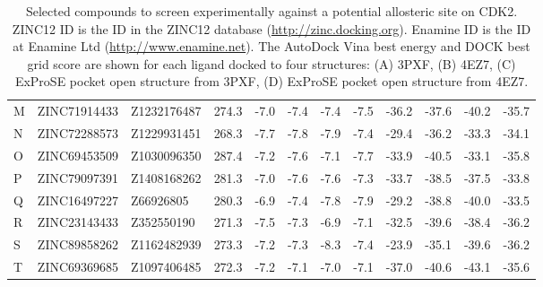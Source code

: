 \begin{table}
\begin{footnotesize}
\begin{tabular}{ p{2cm} l l p{3cm} l l l l l l l l }
M     & ZINC71914433 & Z1232176487 & 274.3 & -7.0  & -7.4  & -7.4  & -7.5  & -36.2 & -37.6 & -40.2 & -35.7 \\
N     & ZINC72288573 & Z1229931451 & 268.3 & -7.7  & -7.8  & -7.9  & -7.4  & -29.4 & -36.2 & -33.3 & -34.1 \\
O     & ZINC69453509 & Z1030096350 & 287.4 & -7.2  & -7.6  & -7.1  & -7.7  & -33.9 & -40.5 & -33.1 & -35.8 \\
P     & ZINC79097391 & Z1408168262 & 281.3 & -7.0  & -7.6  & -7.6  & -7.3  & -33.7 & -38.5 & -37.5 & -33.8 \\
Q     & ZINC16497227 & Z66926805   & 280.3 & -6.9  & -7.4  & -7.8  & -7.9  & -29.2 & -38.8 & -40.0 & -33.5 \\
R     & ZINC23143433 & Z352550190  & 271.3 & -7.5  & -7.3  & -6.9  & -7.1  & -32.5 & -39.6 & -38.4 & -36.2 \\
S     & ZINC89858262 & Z1162482939 & 273.3 & -7.2  & -7.3  & -8.3  & -7.4  & -23.9 & -35.1 & -39.6 & -36.2 \\
T     & ZINC69369685 & Z1097406485 & 272.3 & -7.2  & -7.1  & -7.0  & -7.1  & -37.0 & -40.6 & -43.1 & -35.6 \\
\hline
\end{tabular}
\end{footnotesize}

\caption[Selected compounds to screen experimentally against a potential allosteric site on CDK2]
{Selected compounds to screen experimentally against a potential allosteric site on CDK2.
ZINC12 ID is the ID in the ZINC12 database (\url{http://zinc.docking.org}).
Enamine ID is the ID at Enamine Ltd (\url{http://www.enamine.net}).
The AutoDock Vina best energy and DOCK best grid score are shown for each ligand docked to four structures:
(A) 3PXF,
(B) 4EZ7,
(C) ExProSE pocket open structure from 3PXF,
(D) ExProSE pocket open structure from 4EZ7.}

\label{tab:enamine_compounds}
\end{table}


